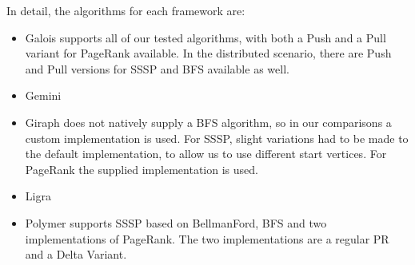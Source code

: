 In detail, the algorithms for each framework are:
\begin{itemize}
	\item Galois supports all of our tested algorithms, with both a Push and a Pull variant for PageRank available. In the distributed scenario, there are Push and Pull versions for SSSP and BFS available as well.
	\item Gemini \todo{}
	\item Giraph does not natively supply a BFS algorithm, so in our comparisons a custom implementation is used. For SSSP, slight variations had to be made to the default implementation, to allow us to use different start vertices. For PageRank the supplied implementation is used.
	\item Ligra \todo{}
	\item Polymer supports SSSP based on BellmanFord, BFS and two implementations of PageRank. The two implementations are a regular PR and a Delta Variant.
\end{itemize}


